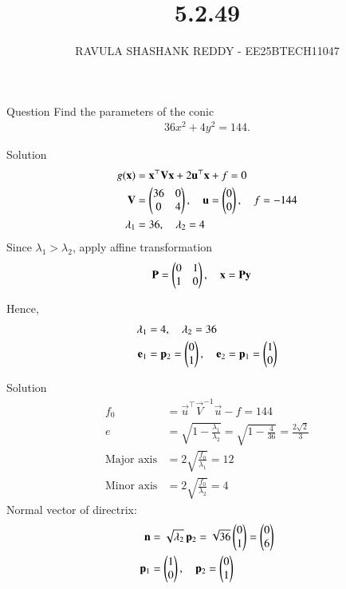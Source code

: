 \documentclass{beamer}
\title %
{5.2.49}
\author %
{RAVULA SHASHANK REDDY - EE25BTECH11047}
\begin{document}
	
	
	\frame{\titlepage}
	\begin{frame}{Question}
    Find the parameters of the conic
\begin{align*}
   36x^2+4y^2=144. 
\end{align*}

\end{frame}
\begin{frame}{Solution}
    \begin{align}
g(\mathbf{x}) &= \mathbf{x}^\top \mathbf{V} \mathbf{x} + 2\mathbf{u}^\top \mathbf{x} + f = 0 \\
\mathbf{V} &= \begin{pmatrix}36 & 0 \\ 0 & 4\end{pmatrix}, \quad 
\mathbf{u}=\begin{pmatrix}0\\0\end{pmatrix}, \quad 
f=-144\\
\lambda_1 &= 36, \quad \lambda_2 = 4 \\
\end{align}
Since $\lambda_1 > \lambda_2$, apply affine transformation
\begin{align}
\mathbf{P} &= \begin{pmatrix}0 & 1 \\ 1 & 0\end{pmatrix}, \quad \mathbf{x} = \mathbf{P}\mathbf{y}
\end{align}

Hence,
\begin{align}
\lambda_1 &= 4, \quad \lambda_2 = 36 \\
\mathbf{e}_1 &= \mathbf{p}_2 = \begin{pmatrix}0\\1\end{pmatrix}, \quad
\mathbf{e}_2 = \mathbf{p}_1 = \begin{pmatrix}1\\0\end{pmatrix}
\end{align}
\end{frame}
\begin{frame}{Solution}
\begin{align}
f_0 &= \vec{u}^\top \vec{V}^{-1}\vec{u} - f = 144\\
e &= \sqrt{1-\frac{\lambda_1}{\lambda_2}}
= \sqrt{1-\frac{4}{36}}
= \frac{2\sqrt{2}}{3}\\
\text{Major axis} &= 2\sqrt{\frac{f_0}{\lambda_1}}
= 12 \\
\text{Minor axis} &= 2\sqrt{\frac{f_0}{\lambda_2}}
= 4
\end{align}
Normal vector of directrix:
\begin{align}
\mathbf{n} &= \sqrt{\lambda_2}\,\mathbf{p}_2 
= \sqrt{36}\begin{pmatrix}0\\1\end{pmatrix} 
= \begin{pmatrix}0\\6\end{pmatrix}\\
\mathbf{p}_1 &= \begin{pmatrix}1\\0\end{pmatrix}, \quad \mathbf{p}_2 = \begin{pmatrix}0\\1\end{pmatrix}
\end{align}
\end{frame}
\end{document}
